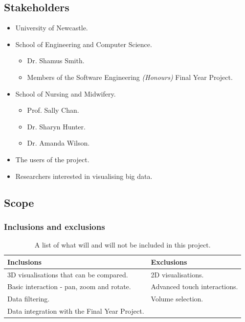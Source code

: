 \documentclass[a4paper]{article}
\begin{document}
{		\subsection{Stakeholders} {
		\label{sec:stakeholders}

			\begin{itemize}
				\item University of Newcastle.
				\item School of Engineering and Computer Science.
				\begin{itemize}
					\item Dr. Shamus Smith.
					\item Members of the Software Engineering \emph{(Honours)} Final Year Project.
				\end{itemize}
				\item School of Nursing and Midwifery.
				\begin{itemize}
					\item Prof. Sally Chan.
					\item Dr. Sharyn Hunter.
					\item Dr. Amanda Wilson.
				\end{itemize}
				\item The users of the project.
				\item Researchers interested in visualising big data.
			\end{itemize}		
		
		}
		
		\subsection{Scope} {
		\label{sec:scope}
		
			\subsubsection{Inclusions and exclusions} {
			\label{sec:inclusions_and_exclusions}
			
				\begin{table}[H]
				\begin{tabularx}{\textwidth}{@{}XX@{}}
					\toprule
					\textbf{Inclusions} & \textbf{Exclusions} \\
					\midrule
					3D visualisations that can be compared. & 2D visualisations. \\
					Basic interaction - pan, zoom and rotate. & Advanced touch interactions. \\
					Data filtering. & Volume selection. \\
					Data integration with the Final Year Project. & \\
					\bottomrule
				\end{tabularx}
				\caption{A list of what will and will not be included in this project.}
				\end{table}
			
}}}
\end{document}
